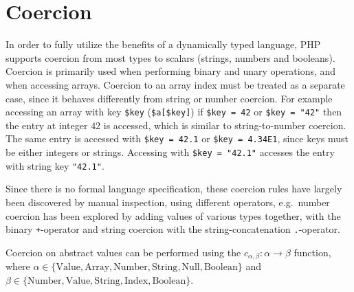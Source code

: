 \section{Coercion}
\label{sec:coercion}

In order to fully utilize the benefits of a dynamically typed language, PHP supports coercion from most types to scalars (strings, numbers and booleans). Coercion is primarily used when performing binary and unary operations, and when accessing arrays. Coercion to an array index must be treated as a separate case, since it behaves differently from string or number coercion. For example accessing an array with key \texttt{\$key} (\texttt{\$a[\$key]}) if \texttt{\$key = 42} or \texttt{\$key = "42"} then the entry at integer $42$ is accessed, which is similar to string-to-number coercion. The same entry is accessed with \texttt{\$key = 42.1} or \texttt{\$key = 4.34E1}, since keys must be either integers or strings. Accessing with \texttt{\$key = "42.1"} accesses the entry with string key \texttt{"42.1"}. 

Since there is no formal language specification, these coercion rules have largely been discovered by manual inspection, using different operators, e.g.\ number coercion has been explored by adding values of various types together, with the binary \texttt{+}-operator and string coercion with the string-concatenation \texttt{.}-operator.

Coercion on abstract values can be performed using the $c_{\alpha, \beta} : \alpha \rightarrow \beta$ function, where $\alpha \in \{ \text{Value}, \text{Array}, \text{Number}, \text{String}, \text{Null}, \text{Boolean}\}$ and $\beta \in \{\text{Number}, \text{Value}, \text{String}, \text{Index}, \text{Boolean}\}$. 

